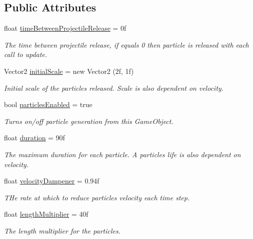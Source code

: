 \subsection*{Public Attributes}
\begin{DoxyCompactItemize}
\item 
float \hyperlink{class_p_e2_d_1_1_custom_particle_emitter_a87bb71bb6472767b7532a19daa0d37e6}{time\+Between\+Projectile\+Release} = 0f
\begin{DoxyCompactList}\small\item\em The time between projectile release, if equals 0 then particle is released with each call to update. \end{DoxyCompactList}\item 
Vector2 \hyperlink{class_p_e2_d_1_1_custom_particle_emitter_a30b68ba2956245b5e75b81aee52ef0f1}{initial\+Scale} = new Vector2 (2f, 1f)
\begin{DoxyCompactList}\small\item\em Initial scale of the particles released. Scale is also dependent on velocity. \end{DoxyCompactList}\item 
bool \hyperlink{class_p_e2_d_1_1_custom_particle_emitter_a502b91bc7626becb13d2d908f8cc679d}{particles\+Enabled} = true
\begin{DoxyCompactList}\small\item\em Turns on/off particle generation from this Game\+Object. \end{DoxyCompactList}\item 
float \hyperlink{class_p_e2_d_1_1_custom_particle_emitter_a9dea38f5fcd24b14763dd9d7fc26cb7a}{duration} = 90f
\begin{DoxyCompactList}\small\item\em The maximum duration for each particle. A particles life is also dependent on velocity. \end{DoxyCompactList}\item 
float \hyperlink{class_p_e2_d_1_1_custom_particle_emitter_a04f3d21e5ff2436efce1e0f1a8777b03}{velocity\+Dampener} = 0.\+94f
\begin{DoxyCompactList}\small\item\em T\+He rate at which to reduce particles velocity each time step. \end{DoxyCompactList}\item 
float \hyperlink{class_p_e2_d_1_1_custom_particle_emitter_aaf85215c89bfa7e36482394c042af95e}{length\+Multiplier} = 40f
\begin{DoxyCompactList}\small\item\em The length multiplier for the particles. \end{DoxyCompactList}\item 

\end{DoxyCompactItemize}
